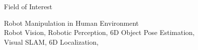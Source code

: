 \begin{rSection}{Field of Interest}
\item Robot Manipulation in Human Environment \\ Robot Vision, Robotic Perception, 6D Object Pose Estimation, \\ Visual \acf{SLAM}, 6D Localization,
\end{rSection}